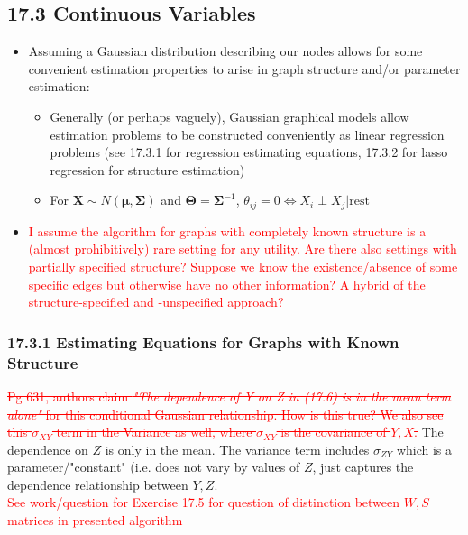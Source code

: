 \documentclass[11pt]{article}
\begin{document}
\subsection*{17.3 Continuous Variables}

\begin{itemize}
    \item Assuming a Gaussian distribution describing our nodes allows for some convenient estimation properties to arise in graph structure and/or parameter estimation:
    \begin{itemize}
        \item Generally (or perhaps vaguely), Gaussian graphical models allow estimation problems to be constructed conveniently as linear regression problems (see 17.3.1 for regression estimating equations, 17.3.2 for lasso regression for structure estimation)
        \item For $\mathbf{X} \sim N(\boldsymbol{\mu}, \boldsymbol\Sigma)$ and $\boldsymbol\Theta = \boldsymbol\Sigma^{-1}$, $\theta_{ij}=0 \Leftrightarrow X_i \perp X_j | \text{rest}$
    \end{itemize}
    \item \textcolor{red}{I assume the algorithm for graphs with completely known structure is a (almost prohibitively) rare setting for any utility. Are there also settings with partially specified structure? Suppose we know the existence/absence of some specific edges but otherwise have no other information? A hybrid of the structure-specified and -unspecified approach?}
\end{itemize}

\subsubsection{17.3.1 Estimating Equations for Graphs with Known Structure}

\textcolor{red}{\sout{Pg 631, authors claim {\it "The dependence of Y on Z in (17.6) is in the mean term alone"} for this conditional Gaussian relationship. How is this true? We also see this $\sigma_{XY}$ term in the Variance as well, where $\sigma_{XY}$ is the covariance of $Y, X$. }
}
The dependence on $Z$ is only in the mean. The variance term includes $\sigma_{ZY}$ which is a parameter/"constant" (i.e. does not vary by values of $Z$, just captures the dependence relationship between $Y, Z$.   \\


\textcolor{red}{See work/question for Exercise 17.5 for question of distinction between $W, S$ matrices in presented algorithm}
\end{document}

